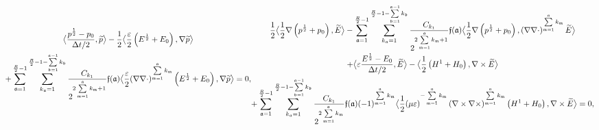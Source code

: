 \documentclass{amsart}
\theoremstyle{thmstyleone}%
\theoremstyle{thmstyletwo}%
\theoremstyle{thmstylethree}%
\newcommand{\aInnerproduct}[2]{\bigl\langle #1, #2 \bigr\rangle}
\begin{document}
\begin{subequations}
  \begin{multline}
    \aInnerproduct{\dfrac{p^{\frac{1}{2}} - p_0}{\Delta t/2}}{\widetilde{p}} - \dfrac{1}{2} \aInnerproduct{\dfrac{\varepsilon}{2} \left( E^{\frac{1}{2}} + E_0 \right)}{\nabla \widetilde{p}} \\ + \sum\limits_{\mathfrak{a} = 1}^{\frac{R}{2} - 1} \sum\limits_{k_\mathfrak{a} = 1}^{\frac{R}{2} - 1 - \sum\limits_{\mathfrak{b} = 1}^{\mathfrak{a} - 1} k_\mathfrak{b}} \dfrac{C_{k_1}}{2^{2 \sum\limits_{\mathfrak{m} = 1}^\mathfrak{a} k_\mathfrak{m} + 1}} \mathfrak{f}( \mathfrak{a}) \aInnerproduct{\dfrac{\varepsilon}{2} (\nabla \nabla \cdot)^{\sum\limits_{\mathfrak{m} = 1}^\mathfrak{a} k_\mathfrak{m}} \left( E^{\frac{1}{2}} + E_0 \right)}{\nabla \widetilde{p}}  = 0, \label{eqn:maxwell_p0_lfR}
    \end{multline} \\
    \begin{multline}
  \dfrac{1}{2}  \aInnerproduct{\dfrac{1}{2} \nabla \left(  p^{\frac{1}{2}} +  p_0 \right)}{\widetilde{E}} - \sum\limits_{\mathfrak{a} = 1}^{\frac{R}{2} - 1} \sum\limits_{k_\mathfrak{a} = 1}^{\frac{R}{2} - 1 - \sum\limits_{\mathfrak{b} = 1}^{\mathfrak{a} - 1} k_\mathfrak{b}} \dfrac{C_{k_1}}{2^{2 \sum\limits_{\mathfrak{m} = 1}^\mathfrak{a} k_\mathfrak{m} + 1}} \mathfrak{f}(\mathfrak{a}) \aInnerproduct{\dfrac{1}{2} \nabla \left(p^{\frac{1}{2}} + p_0 \right)}{\left( \nabla \nabla \cdot \right)^{\sum\limits_{\mathfrak{m} = 1}^\mathfrak{a} k_\mathfrak{m}} \widetilde{E}} \\ + \aInnerproduct{\varepsilon \dfrac{E^{\frac{1}{2}} - E_0}{\Delta t/2}}{\widetilde{E}} - \aInnerproduct{\dfrac{1}{2} \left( H^1 + H_0 \right)}{\nabla \times \widetilde{E}} \\ + \sum\limits_{\mathfrak{a} = 1}^{\frac{R}{2} - 1}\sum\limits_{k_\mathfrak{a} = 1}^{\frac{R}{2} - 1 - \sum\limits_{\mathfrak{b} = 1}^{\mathfrak{a} - 1} k_\mathfrak{b}}  \dfrac{C_{k_1}}{2^{2 \sum\limits_{\mathfrak{m} = 1}^\mathfrak{a} k_\mathfrak{m}}} \mathfrak{f}( \mathfrak{a}) (-1)^{\sum\limits_{\mathfrak{m} = 1}^\mathfrak{a} k_\mathfrak{m}} \aInnerproduct{\dfrac{1}{2} ( \mu \varepsilon )^{-\sum\limits_{\mathfrak{m} = 1}^\mathfrak{a} k_\mathfrak{m}} \left( \nabla \times \nabla \times \right)^{\sum\limits_{\mathfrak{m} = 1}^\mathfrak{a} k_\mathfrak{m}} \left( H^{1} + H_0 \right)}{\nabla \times \widetilde{E}} = 0, \label{eqn:maxwell_E0_lfR} 
  \end{multline} \\
  \begin{multline}

\end{multline}
\end{subequations}
\end{document}
